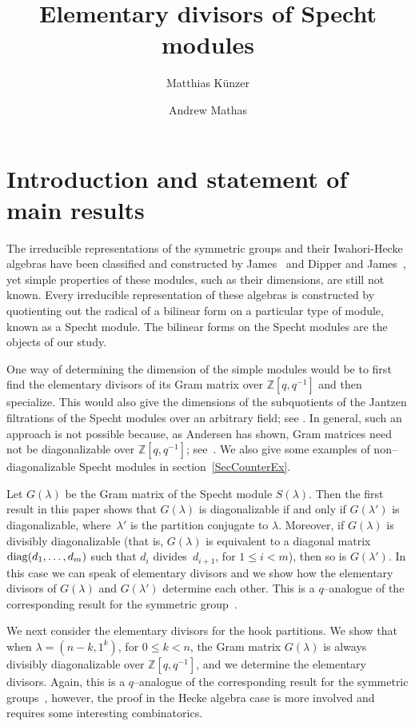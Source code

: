 \documentclass[twoside]{amsart}
\title{Elementary divisors of Specht modules}
\author{Matthias K\"unzer}
\author{Andrew Mathas}
\numberwithin{equation}{section}
\theoremstyle{remark}
\def\diag{\mathop{\rm diag}\nolimits}
\def\Z{{\mathbb Z}}
\begin{document}
\maketitle

\section{Introduction and statement of main results}

The irreducible representations of the symmetric groups and their
Iwahori-Hecke algebras have been classified and constructed by
James~\cite{James:SnIrr} and Dipper and James~\cite{DJ:reps}, yet
simple properties of these modules, such as their dimensions, are
still not known. Every irreducible representation of these algebras is
constructed by quotienting out the radical of a bilinear form on a
particular type of module, known as a Specht module. The bilinear
forms on the Specht modules are the objects of our study.  

One way of determining the dimension of the simple modules would be to
first find the elementary divisors of its Gram matrix over
$\Z[q,q^{-1}]$ and then specialize. This would also give the
dimensions of the subquotients of the Jantzen filtrations of the
Specht modules over an arbitrary field; see \cite{JM:Jantzen}.  In
general, such an approach is not possible because, as Andersen has
shown, Gram matrices need not be diagonalizable over $\Z[q,q^{-1}]$;
see~\cite[Remark~5.11]{Andersen:Tilting}. We also give some examples
of non--diagonalizable Specht modules in section~\ref{SecCounterEx}.

Let $G(\lambda)$ be the Gram matrix of the Specht module $S(\lambda)$.
Then the first result in this paper shows that $G(\lambda)$ is
diagonalizable if and only if $G(\lambda')$ is diagonalizable,
where~$\lambda'$ is the partition conjugate to $\lambda$. Moreover, if
$G(\lambda)$ is divisibly diagonalizable (that is, $G(\lambda)$ is
equivalent to a diagonal matrix $\diag(d_1,\dots,d_m)$ such that $d_i$
divides~$d_{i+1}$, for $1\le i<m$), then so is $G(\lambda')$. In this
case we can speak of elementary divisors and we show how the
elementary divisors of $G(\lambda)$ and $G(\lambda')$ determine each
other. This is a $q$--analogue of the corresponding result for the
symmetric group~\cite{KN}.

We next consider the elementary divisors for the hook partitions. We
show that when $\lambda = (n-k,1^k)$, for $0\le k<n$, the Gram matrix
$G(\lambda)$ is always divisibly diagonalizable over $\Z[q,q^{-1}]$,
and we determine the elementary divisors. Again, this is a
$q$--analogue of the corresponding result for the symmetric
groups~\cite{KN}, however, the proof in the Hecke algebra case is more
involved and requires some interesting combinatorics.
\end{document}
